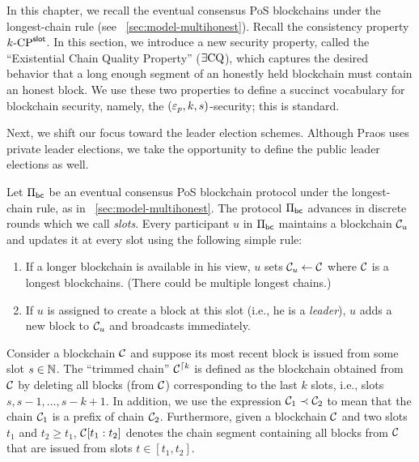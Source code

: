 

In this chapter, 
we recall the eventual consensus PoS blockchains under the longest-chain rule 
(see \Section~\ref{sec:model-multihonest}). 
Recall the consistency property ${k}\text{-}\mathrm{CP}^{\mathsf{slot}}$. 
In this section, we introduce a new security property, called the ``Existential Chain Quality Property'' ($\exists\mathrm{CQ}$), 
which captures the desired behavior that a long enough segment of an honestly held blockchain 
must contain an honest block. 
We use these two properties to define a succinct vocabulary for blockchain security, 
namely, the $(\mathsf{\varepsilon}_p, k, s)$-security; this is standard.

Next, we shift our focus toward the leader election schemes. 
Although Praos uses private leader elections, 
we take the opportunity to define the public leader elections as well. 


    Let $\Pi_\mathsf{bc}$ be an eventual consensus PoS blockchain protocol 
    under the longest-chain rule, 
    as in \Section~\ref{sec:model-multihonest}. 
    The protocol $\Pi_\mathsf{bc}$ advances in discrete rounds 
    which we call \emph{slots}.
    Every participant $u$ in $\Pi_\mathsf{bc}$ 
    maintains a blockchain $\mathcal{C}_u$ 
    and updates it at every slot using the following simple rule: 
    \begin{enumerate}
      \item If a longer blockchain is available in his view, 
      $u$ sets $\mathcal{C}_u \leftarrow \mathcal{C}$ where 
      $\mathcal{C}$ is a longest blockchains. 
      (There could be multiple longest chains.)

      \item If $u$ is assigned to create a block at this slot 
      (i.e., he is a \emph{leader}),
      $u$ adds a new block to $\mathcal{C}_u$ and broadcasts immediately.
    \end{enumerate}

    Consider a blockchain $\mathcal{C}$ and suppose its most recent block is issued from some slot $s \in \mathbb{N}$. 
    The ``trimmed chain'' $\mathcal{C}^{\lceil {k}}$ is defined as 
    the blockchain obtained from $\mathcal{C}$ by deleting all blocks (from $\mathcal{C}$) 
    corresponding to the last $k$ slots, i.e., slots $s, s - 1, \ldots, s - k + 1$. 
    In addition, we use the expression $\mathcal{C}_1 \prec \mathcal{C}_2$ to mean that 
    the chain $\mathcal{C}_1$ is a prefix of chain $\mathcal{C}_2$. 
    Furthermore, given a blockchain $\mathcal{C}$ and two slots $t_1$ and $t_2 \geq t_1$, 
    $\mathcal{C}[t_1 : t_2]$ denotes the chain segment containing all blocks from $\mathcal{C}$ 
    that are issued from slots $t \in [t_1, t_2]$.

